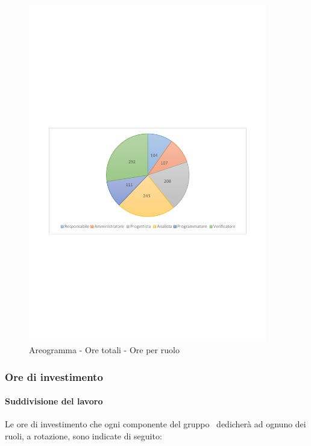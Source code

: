 \documentclass[../PianoProgetto.tex]{subfiles}
\begin{document}
	\begin{figure}[!h]
		\centering
		\includegraphics[width=0.93\textwidth , trim=2cm 9.5cm 2cm 11cm]{grafici/Riepilogo/Totali/ore-ruolo}
			\caption{Areogramma - Ore totali - Ore per ruolo}
		\label{fig:CircleChart-totale_ore_r}
	\end{figure}	
\vfill
\newpage
	
	\subsubsection{Ore di investimento}
				\paragraph{Suddivisione del lavoro}
					Le ore di investimento che ogni componente del gruppo \leaf\ dedicherà ad ognuno dei ruoli, a rotazione, sono indicate di seguito:
	
\end{document}
